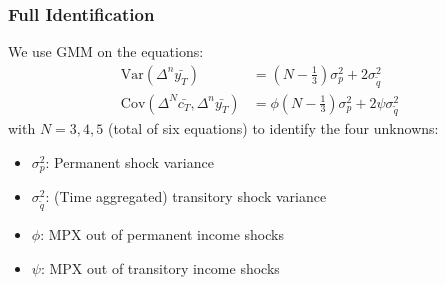 \documentclass{beamer}
\begin{document}
\frame
{
	\frametitle{Full Identification}
We use GMM on the equations:
\begin{align*}
\mathrm{Var}(\Delta^n \bar{y_T} ) &=  (N-\frac{1}{3}) \sigma^2_p + 2  \sigma^2_{\tilde{q}} \\
\mathrm{Cov}(\Delta^N \bar{c_T},\Delta^n \bar{y_T} ) &= \phi (N-\frac{1}{3}) \sigma^2_p + 2 \psi \sigma^2_{\tilde{q}}
\end{align*}
with $N=3,4,5$ (total of six equations) to identify the four unknowns:
\begin{itemize}
	\item $\sigma^2_p$: Permanent shock variance
	\item $\sigma^2_{\tilde{q}}$: (Time aggregated) transitory shock variance
	\item $\phi$: MPX out of permanent income shocks
	\item $\psi$: MPX out of transitory income shocks
\end{itemize}
}
\end{document}

